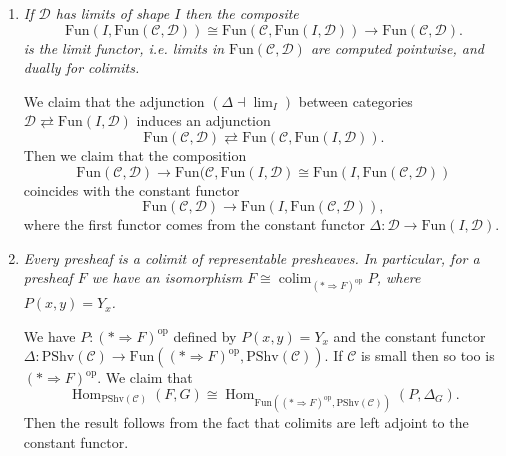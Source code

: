 \documentclass[10pt]{article}
\newcommand{\ccat}{\mathcal{C}}
\newcommand{\dcat}{\mathcal{D}}
\newcommand{\nt}{\Rightarrow}
\newcommand{\Fun}{\mathrm{Fun}}
\newcommand{\PShv}{\mathrm{PShv}}
\newcommand{\op}[1]{{#1}^\text{op}}
\DeclareMathOperator{\Hom}{Hom}
\DeclareMathOperator*{\colim}{colim}
\begin{document}
                \begin{enumerate}
                    \item \emph{If $\dcat$ has limits of shape $I$ then the composite}
                        \begin{equation*}
                            \Fun(I,\Fun(\ccat,\dcat)) \cong \Fun(\ccat,\Fun(I,\dcat))\to\Fun(\ccat,\dcat).
                        \end{equation*}
                        \emph{is the limit functor, i.e. limits in $\Fun(\ccat,\dcat)$ are computed pointwise, and dually for colimits.}

                            We claim that the adjunction $(\Delta\dashv\lim_I)$ between categories $\dcat\rightleftarrows\Fun(I,\dcat)$ induces an adjunction
                            \begin{equation*}
                                \Fun(\ccat,\dcat)\rightleftarrows\Fun(\ccat,\Fun(I,\dcat)).
                            \end{equation*}
                            Then we claim that the composition
                            \begin{equation*}
                                \Fun(\ccat,\dcat)\to\Fun(\ccat,\Fun(I,\dcat)\cong\Fun(I,\Fun(\ccat,\dcat))
                            \end{equation*}
                            coincides with the constant functor
                            \begin{equation*}
                                \Fun(\ccat,\dcat)\to\Fun(I,\Fun(\ccat,\dcat)),
                            \end{equation*}
                            where the first functor comes from the constant functor $\Delta\colon\dcat\to\Fun(I,\dcat)$.

                    \item \emph{Every presheaf is a colimit of representable presheaves.}
                        \emph{In particular, for a presheaf $F$ we have an isomorphism $F\cong\colim_{\op{(*\nt F)}}P$, where $P(x,y)=Y_x$.}

                            We have $P\colon\op{(*\nt F)}$ defined by $P(x,y)=Y_x$ and the constant functor $\Delta\colon\PShv(\ccat)\to\Fun(\op{(*\nt F)},\PShv(\ccat))$.
                            If $\ccat$ is small then so too is $\op{(*\nt F)}$.
                            We claim that
                            \begin{equation*}
                                \Hom_{\PShv(\ccat)}(F,G) \cong \Hom_{\Fun(\op{(*\nt F)},\PShv(\ccat))}(P,\Delta_G).
                            \end{equation*}
                            Then the result follows from the fact that colimits are left adjoint to the constant functor.


\end{enumerate}
\end{document}
